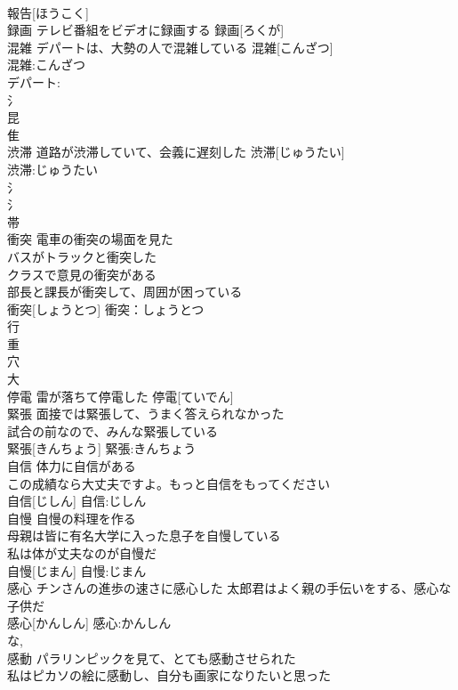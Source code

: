 \documentclass[8pt]{extreport}
\begin{document}
\begin{CJK}{UTF8}{min}
\\	報告[ほうこく]						
\\	録画	テレビ番組をビデオに録画する	録画[ろくが]	
\\	混雑	デパートは、大勢の人で混雑している	混雑[こんざつ]	
\\	混雑:こんざつ
\\	デパート:
\\	氵 
\\	昆 
\\	隹 
\\	渋滞	道路が渋滞していて、会義に遅刻した	渋滞[じゅうたい]	
\\	渋滞:じゅうたい
\\	氵 
\\	氵 
\\	帯 
\\	衝突	電車の衝突の場面を見た 
\\	バスがトラックと衝突した 
\\	クラスで意見の衝突がある 
\\	部長と課長が衝突して、周囲が困っている 
\\	衝突[しょうとつ]			衝突：しょうとつ
\\	行 
\\	重 
\\	穴 
\\	大 
\\	停電	雷が落ちて停電した	停電[ていでん]	
\\	緊張	面接では緊張して、うまく答えられなかった 
\\	試合の前なので、みんな緊張している 
\\	緊張[きんちょう]			緊張:きんちょう
\\	自信	体力に自信がある 
\\	この成績なら大丈夫ですよ。もっと自信をもってください 
\\	自信[じしん]			自信:じしん
\\	自慢	自慢の料理を作る 
\\	母親は皆に有名大学に入った息子を自慢している 
\\	私は体が丈夫なのが自慢だ 
\\	自慢[じまん]			自慢:じまん
\\	感心	チンさんの進歩の速さに感心した 太郎君はよく親の手伝いをする、感心な子供だ 
\\	感心[かんしん]			感心:かんしん
\\	な, 
\\	感動	パラリンピックを見て、とても感動させられた 
\\	私はピカソの絵に感動し、自分も画家になりたいと思った 

\end{CJK}
\end{document}
